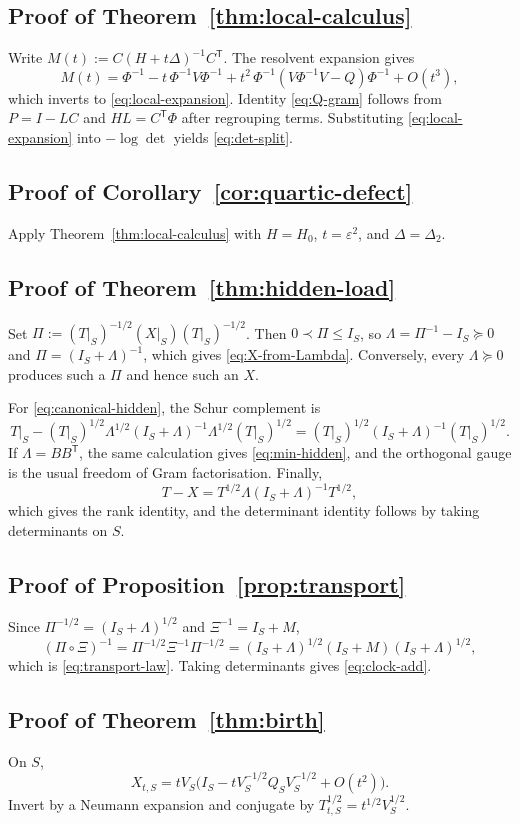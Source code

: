 \documentclass[11pt,a4paper]{article}
\numberwithin{equation}{section}
\theoremstyle{thmcompact}
\theoremstyle{remark}
\begin{document}
\subsection*{Proof of Theorem~\ref{thm:local-calculus}}
Write $M(t):=C(H+t\Delta)^{-1}C^{\mathsf T}$. The resolvent expansion gives
\[
M(t)=\Phi^{-1}-t\,\Phi^{-1}V\Phi^{-1}+t^2\,\Phi^{-1}(V\Phi^{-1}V-Q)\Phi^{-1}+O(t^3),
\]
which inverts to \eqref{eq:local-expansion}. Identity \eqref{eq:Q-gram} follows from $P=I-LC$ and $HL=C^{\mathsf T}\Phi$ after regrouping terms. Substituting \eqref{eq:local-expansion} into $-\log\det$ yields \eqref{eq:det-split}.

\subsection*{Proof of Corollary~\ref{cor:quartic-defect}}
Apply Theorem~\ref{thm:local-calculus} with $H=H_0$, $t=\varepsilon^2$, and $\Delta=\Delta_2$.

\subsection*{Proof of Theorem~\ref{thm:hidden-load}}
Set $\Pi:=(T|_S)^{-1/2}(X|_S)(T|_S)^{-1/2}$. Then $0\prec\Pi\le I_S$, so $\Lambda=\Pi^{-1}-I_S\succeq 0$ and $\Pi=(I_S+\Lambda)^{-1}$, which gives \eqref{eq:X-from-Lambda}. Conversely, every $\Lambda\succeq 0$ produces such a $\Pi$ and hence such an $X$.

For \eqref{eq:canonical-hidden}, the Schur complement is
\[
T|_S-(T|_S)^{1/2}\Lambda^{1/2}(I_S+\Lambda)^{-1}\Lambda^{1/2}(T|_S)^{1/2}
=(T|_S)^{1/2}(I_S+\Lambda)^{-1}(T|_S)^{1/2}.
\]
If $\Lambda=BB^{\mathsf T}$, the same calculation gives \eqref{eq:min-hidden}, and the orthogonal gauge is the usual freedom of Gram factorisation. Finally,
\[
T-X=T^{1/2}\Lambda(I_S+\Lambda)^{-1}T^{1/2},
\]
which gives the rank identity, and the determinant identity follows by taking determinants on $S$.

\subsection*{Proof of Proposition~\ref{prop:transport}}
Since $\Pi^{-1/2}=(I_S+\Lambda)^{1/2}$ and $\Xi^{-1}=I_S+M$,
\[
(\Pi\circ\Xi)^{-1}
=
\Pi^{-1/2}\Xi^{-1}\Pi^{-1/2}
=
(I_S+\Lambda)^{1/2}(I_S+M)(I_S+\Lambda)^{1/2},
\]
which is \eqref{eq:transport-law}. Taking determinants gives \eqref{eq:clock-add}.

\subsection*{Proof of Theorem~\ref{thm:birth}}
On $S$,
\[
X_{t,S}=tV_S\bigl(I_S-tV_S^{-1/2}Q_SV_S^{-1/2}+O(t^2)\bigr).
\]
Invert by a Neumann expansion and conjugate by $T_{t,S}^{1/2}=t^{1/2}V_S^{1/2}$.
\end{document}
